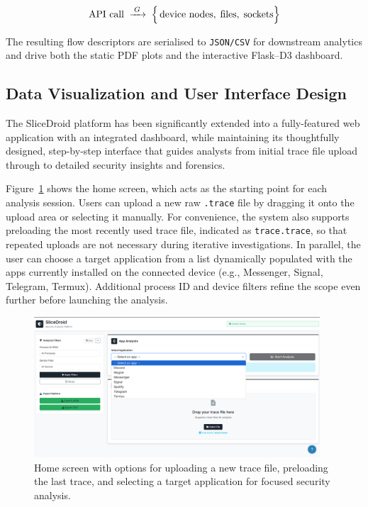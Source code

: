 \documentclass[a4paper,12pt]{report}
\begin{document}
\[
  \text{API call} \;\xrightarrow{\;G\;}\;
  \Bigl\{\,
     \text{device nodes},\;
     \text{files},\;
     \text{sockets}
  \Bigr\}
\]

\noindent
The resulting flow descriptors are serialised to
\texttt{JSON/CSV} for downstream analytics and drive both the static
PDF plots and the interactive Flask–D3 dashboard.


\subsection{Data Visualization and User Interface Design}

The SliceDroid platform has been significantly extended into a fully-featured web application with an integrated dashboard, while maintaining its thoughtfully designed, step-by-step interface that guides analysts from initial trace file upload through to detailed security insights and forensics.

Figure~\ref{fig:home_screen} shows the home screen, which acts as the starting point for each analysis session. Users can upload a new raw \texttt{.trace} file by dragging it onto the upload area or selecting it manually. For convenience, the system also supports preloading the most recently used trace file, indicated as \texttt{trace.trace}, so that repeated uploads are not necessary during iterative investigations.
In parallel, the user can choose a target application from a list dynamically populated with the apps currently installed on the connected device (e.g., Messenger, Signal, Telegram, Termux).
 Additional process ID and device filters refine the scope even further before launching the analysis.

\begin{figure}[H]
\centering
\includegraphics[width=0.95\textwidth]{home_screen.png}
\caption{Home screen with options for uploading a new trace file, preloading the last trace, and selecting a target application for focused security analysis.}
\label{fig:home_screen}
\end{figure}
\end{document}
